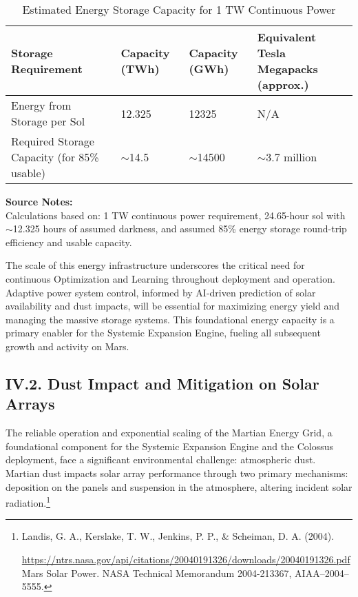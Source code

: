 \documentclass[fontsize=10pt, oneside, DIV=calc]{scrartcl}
\begin{document}
\begin{table}[htbp]
\centering
\caption{Estimated Energy Storage Capacity for 1 TW Continuous Power}
\begin{tabularx}{\textwidth}{|X|X|X|X|}
\hline
\textbf{Storage Requirement} & \textbf{Capacity (TWh)} & \textbf{Capacity (GWh)} & \textbf{Equivalent Tesla Megapacks (approx.)} \\ \hline
Energy from Storage per Sol & 12.325 & 12325 & N/A \\ \hline
Required Storage Capacity (for 85\% usable) & $\sim$14.5 & $\sim$14500 & $\sim$3.7 million \\ \hline
\end{tabularx}
\end{table}
\noindent\footnotesize
\textbf{Source Notes:}\\[0.5em]
Calculations based on: 1 TW continuous power requirement, 24.65-hour sol with $\sim$12.325 hours of assumed darkness, and assumed 85\% energy storage round-trip efficiency and usable capacity.\\[1em]

\medskip

\noindent
The scale of this energy infrastructure underscores the critical need for continuous Optimization and Learning throughout deployment and operation. Adaptive power system control, informed by AI-driven prediction of solar availability and dust impacts, will be essential for maximizing energy yield and managing the massive storage systems. This foundational energy capacity is a primary enabler for the Systemic Expansion Engine, fueling all subsequent growth and activity on Mars.



\subsection*{IV.2. Dust Impact and Mitigation on Solar Arrays}



\medskip

\noindent
The reliable operation and exponential scaling of the Martian Energy Grid, a foundational component for the Systemic Expansion Engine and the Colossus deployment, face a significant environmental challenge: atmospheric dust. Martian dust impacts solar array performance through two primary mechanisms: deposition on the panels and suspension in the atmosphere, altering incident solar radiation.\footnote{Landis, G. A., Kerslake, T. W., Jenkins, P. P., \& Scheiman, D. A. (2004). 







\href{https://ntrs.nasa.gov/api/citations/20040191326/downloads/20040191326.pdf}\url{https://ntrs.nasa.gov/api/citations/20040191326/downloads/20040191326.pdf} Mars Solar Power. NASA Technical Memorandum 2004-213367, AIAA–2004–5555.}
\end{document}

